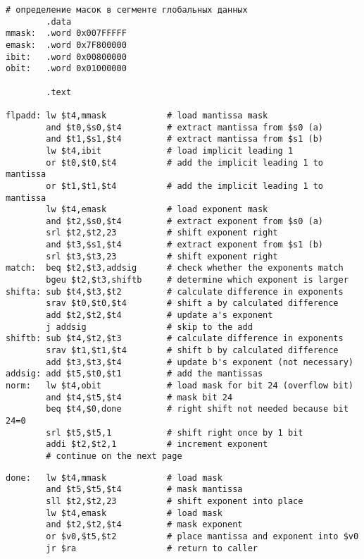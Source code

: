 \documentclass[12pt]{article}
\begin{document}
    \begin{verbatim}
# определение масок в сегменте глобальных данных
        .data
mmask:  .word 0x007FFFFF
emask:  .word 0x7F800000
ibit:   .word 0x00800000
obit:   .word 0x01000000

        .text

flpadd: lw $t4,mmask            # load mantissa mask
        and $t0,$s0,$t4         # extract mantissa from $s0 (a)
        and $t1,$s1,$t4         # extract mantissa from $s1 (b)
        lw $t4,ibit             # load implicit leading 1
        or $t0,$t0,$t4          # add the implicit leading 1 to mantissa
        or $t1,$t1,$t4          # add the implicit leading 1 to mantissa
        lw $t4,emask            # load exponent mask
        and $t2,$s0,$t4         # extract exponent from $s0 (a)
        srl $t2,$t2,23          # shift exponent right
        and $t3,$s1,$t4         # extract exponent from $s1 (b)
        srl $t3,$t3,23          # shift exponent right
match:  beq $t2,$t3,addsig      # check whether the exponents match
        bgeu $t2,$t3,shiftb     # determine which exponent is larger
shifta: sub $t4,$t3,$t2         # calculate difference in exponents
        srav $t0,$t0,$t4        # shift a by calculated difference
        add $t2,$t2,$t4         # update a's exponent
        j addsig                # skip to the add
shiftb: sub $t4,$t2,$t3         # calculate difference in exponents
        srav $t1,$t1,$t4        # shift b by calculated difference
        add $t3,$t3,$t4         # update b's exponent (not necessary)
addsig: add $t5,$t0,$t1         # add the mantissas
norm:   lw $t4,obit             # load mask for bit 24 (overflow bit)
        and $t4,$t5,$t4         # mask bit 24
        beq $t4,$0,done         # right shift not needed because bit 24=0
        srl $t5,$t5,1           # shift right once by 1 bit
        addi $t2,$t2,1          # increment exponent
        # continue on the next page
    \end{verbatim}

    \newpage

    \begin{verbatim}
done:   lw $t4,mmask            # load mask
        and $t5,$t5,$t4         # mask mantissa
        sll $t2,$t2,23          # shift exponent into place
        lw $t4,emask            # load mask
        and $t2,$t2,$t4         # mask exponent
        or $v0,$t5,$t2          # place mantissa and exponent into $v0
        jr $ra                  # return to caller
    \end{verbatim}
\end{document}
